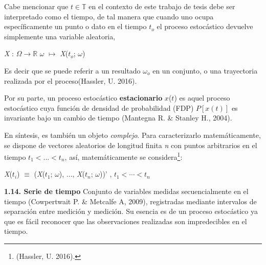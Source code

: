 Cabe mencionar que $ \mathit{t} \in \mathbb{T}$ en el contexto de este trabajo de tesis debe ser interpretado como el \guillemotleft tiempo\guillemotright, de tal manera que cuando uno ocupa específicamente un punto o dato en el tiempo $\mathit{t}_{o}$ el proceso estocástico devuelve simplemente una variable aleatoria, \newline

\begin{center}
\hspace{1.77cm}\textit{X} : $ \mathit{\Omega} \rightarrow \mathbb{R} $\newline 
$\mathit{\omega}$ $\mapsto$ \textit{X}($\mathit{t_{o}}$; $\omega$)
\end{center}

Es decir que se puede referir a un resultado $\mathit{\omega_{o}}$ en un conjunto, o una \guillemotleft trayectoria \guillemotright realizada por el proceso(Hassler, U. 2016). 
\newline

Por su parte, un proceso estocástico \textbf{estacionario} $\mathit{x}$($\mathit{t}$) es aquel proceso estocástico cuya función de densidad de probabilidad (FDP) $P[\mathit{x}(\mathit{t})]$ es invariante bajo un cambio de tiempo (Mantegna R. \& Stanley H., 2004).
\newline

En síntesis, es también un objeto \textit{complejo}. Para caracterizarlo matemáticamente, se dispone de vectores aleatorios de longitud finita \textit{n} con puntos arbitrarios en el tiempo $\mathit{t_{1} < ... < \mathit{t_{n}}}$, así, matemáticamente se considera\footnote{(Hassler, U. 2016). }: 
\begin{center}
\textit{X}($\mathit{t_{i}}$) $\equiv$ (\textit{X}($\mathit{t_{
1}}$; $\mathit{\omega}$), ..., \textit{X}($\mathit{t_{
n}}$; $\mathit{\omega}$))' \hspace{0.5cm},\hspace{0.5cm} $\mathit{t_{1}} < \cdots < \mathit{t_{n}}$ 
\end{center}
\newpage
{
\noindent
\Large  \textbf{1.14. Serie de tiempo} 
}
\newline
Conjunto de variables medidas secuencialmente en el tiempo (Cowpertwait P. \& Metcalfe A, 2009), registradas mediante intervalos de separación entre medición y medición. Su esencia es de un proceso estocástico ya que es fácil reconocer que las observaciones realizadas son impredecibles en el tiempo.
\newline

